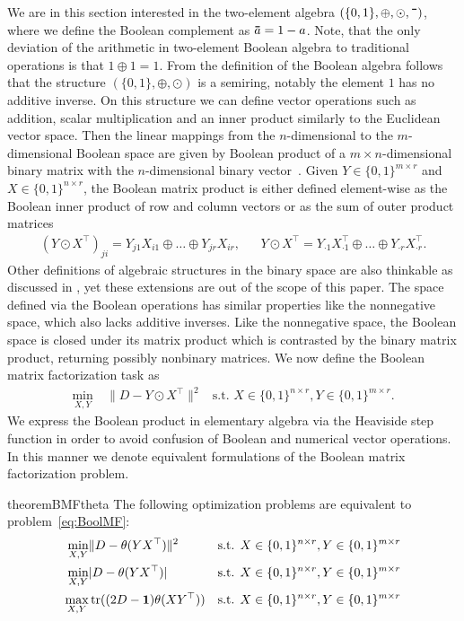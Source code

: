 We are in this section interested in the two-element algebra $(\{0,1\},\oplus,\odot,\thickbar{\phantom{a}})$, where we define the Boolean complement as $\thickbar{a}=1-a$. Note, that the only deviation of the arithmetic in two-element Boolean algebra to traditional operations is that $1\oplus 1=1$. From the definition of the Boolean algebra follows that the structure $(\{0,1\},\oplus,\odot)$ is a semiring, notably the element $1$ has no additive inverse. On this structure we can define vector operations such as addition, scalar multiplication and an inner product similarly to the Euclidean vector space. Then the linear mappings from the $n$-dimensional to the $m$-dimensional Boolean space are given by Boolean product of  a $m\times n$-dimensional binary matrix with the $n$-dimensional binary vector~\citep{gudder2009boolean}. Given $Y\in\{0,1\}^{m\times r}$ and $X\in\{0,1\}^{n\times r}$, the Boolean matrix product is either defined element-wise as the Boolean inner product of row and column vectors or as the sum of outer product matrices
\begin{align*}
    (Y\odot X^\top)_{ji}=Y_{j1}X_{i1}\oplus \ldots \oplus Y_{jr}X_{ir},&& Y\odot X^\top = Y_{\cdot 1}X_{\cdot 1}^\top\oplus \ldots \oplus Y_{\cdot r}X_{\cdot r}^\top.
\end{align*}
Other definitions of algebraic structures in the binary space are also thinkable as discussed in \cite{miettinen2015generalized}, yet these extensions are out of the scope of this paper.
The space defined via the Boolean operations has similar properties like the nonnegative space, which also lacks additive inverses. Like the nonnegative space, the Boolean space is closed under its matrix product which is contrasted by the binary matrix product, returning possibly nonbinary matrices. We now define the Boolean matrix factorization task as
\begin{align} \label{eq:BoolMF}
\min_{X,Y}\ &\|D-Y\odot X^\top\|^2 & \text{s.t. } X\in\{0,1\}^{n\times r},Y\in\{0,1\}^{m\times r}. \tag{BMF}
\end{align}
We express the Boolean product in elementary algebra via the Heaviside step function in order to avoid confusion of Boolean and numerical vector operations. In this manner we denote equivalent formulations of the Boolean matrix factorization problem.
\begin{restatable}{theorem}{BMFtheta}\label{thm:BMFtheta}
The following optimization problems are equivalent to problem~\eqref{eq:BoolMF}:
\begin{align}
    \label{eq:BoolMF_theta}
    \min_{X,Y}& \|D-\theta(YX^\top)\|^2 & \text{s.t. } X\in\{0,1\}^{n\times r},Y\in\{0,1\}^{m\times r}\\
    \label{eq:BoolMF_abs}
    \min_{X,Y}& |D-\theta(YX^\top)| & \text{s.t. } X\in\{0,1\}^{n\times r},Y\in\{0,1\}^{m\times r}\\
    \label{eq:BoolMF_thetaTr}
    \max_{X,Y}& \operatorname*{tr}( (2D-\mathbf{1})\theta(XY^\top)) & \text{s.t. } X\in\{0,1\}^{n\times r},Y\in\{0,1\}^{m\times r}
\end{align}
\end{restatable}
